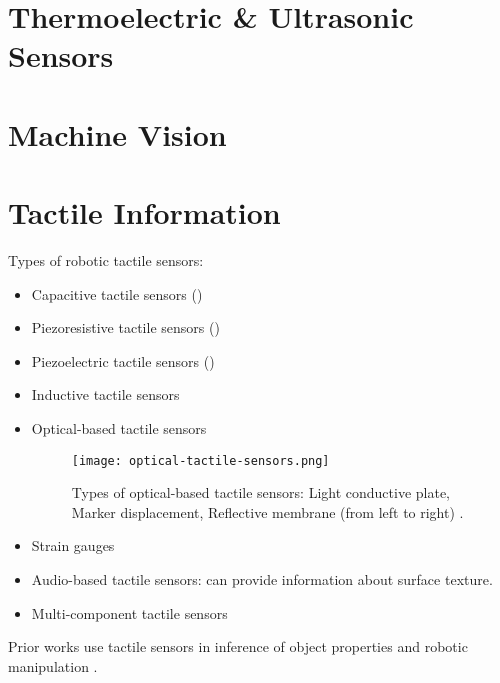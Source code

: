 \section{Thermoelectric \& Ultrasonic Sensors}

\section{Machine Vision}

\section{Tactile Information}

Types of robotic tactile sensors:
\begin{itemize}
	\item Capacitive tactile sensors ()
	\item Piezoresistive tactile sensors ()
	\item Piezoelectric tactile sensors ()
	\item Inductive tactile sensors
	\item Optical-based tactile sensors
	\begin{figure}[hbt!]
		\centering
		\texttt{[image: optical-tactile-sensors.png]}
		\caption{Types of optical-based tactile sensors: Light conductive plate, Marker displacement, Reflective membrane (from left to right) \cite{shimonomura2019tactile}.}
	\end{figure}
	\item Strain gauges
	\item Audio-based tactile sensors: can provide information about surface texture.
	\item Multi-component tactile sensors
\end{itemize}
Prior works use tactile sensors in inference of object properties \cite{luo2017robotic} and robotic manipulation \cite{yamaguchi2019recent}.
